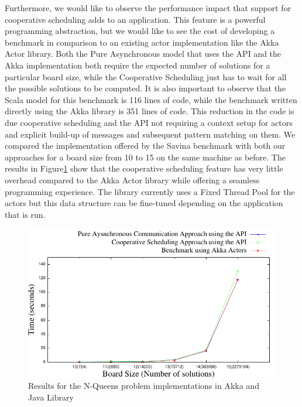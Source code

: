 \par Furthermore, we would like to observe the performance impact that support for cooperative scheduling adds to an application. This feature is a powerful programming abstraction, but we would like to see the cost of developing a benchmark in comparison to an existing actor implementation like the Akka Actor library. Both the Pure Asynchronous model that uses the API and the Akka implementation both require the expected number of solutions for a particular board size, while the Cooperative Scheduling just has to wait for all the possible solutions to be computed. It is also important to observe that the Scala model for this benchmark is 116 lines of code, while the benchmark written directly using the Akka library is 351 lines of code. This reduction in the code is due cooperative scheduling and the API not requiring a context setup for actors and explicit build-up of messages and subsequent pattern matching on them.  We compared the implementation offered by the Savina benchmark with both our approaches for a board size from 10 to 15 on the same machine as before. The results in Figure\ref{aj} show that the cooperative scheduling feature has very little overhead compared to the Akka Actor library while offering a seamless programming experience. The library currently uses a Fixed Thread Pool for the actors but this data structure can be fine-tuned depending on the application that is run.

\begin{figure}
\centering
\includegraphics[scale=.7]{akkaapi.pdf}
\caption{Results for the N-Queens problem implementations in Akka and Java Library}
\label{aj}
\end{figure}

